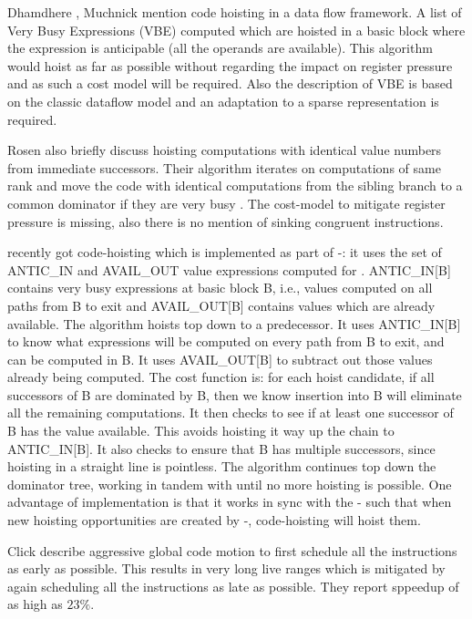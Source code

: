 \documentclass[acmlarge,review,anonymous]{acmart}\settopmatter{printfolios=true}
\begin{document}
Dhamdhere \cite{dhamdhere1988fast}, Muchnick \cite{steven1997advanced} mention
code hoisting in a data flow framework. A list of Very Busy Expressions (VBE)
computed which are hoisted in a basic block where the expression is
anticipable (all the operands are available). This algorithm would hoist as far
as possible without regarding the impact on register pressure and as such a cost
model will be required.  Also the description of VBE is based on the classic
dataflow model and an adaptation to a sparse \SSA{} representation is required.

Rosen \cite{rosen1988global} also briefly discuss hoisting computations with
identical value numbers from immediate successors. Their algorithm iterates on
computations of same rank and move the code with identical computations from the
sibling branch to a common dominator if they are very busy
\cite{steven1997advanced}. The cost-model to mitigate register pressure is
missing, also there is no mention of sinking congruent instructions.

\GCC{} recently got code-hoisting \cite{GCCCodeHoisting} which is implemented as
part of \GVN{}-\PRE{}: it uses the set of ANTIC\_IN and AVAIL\_OUT value
expressions computed for \PRE{}. ANTIC\_IN[B] contains very busy expressions at
basic block B, i.e., values computed on all paths from B to exit and
AVAIL\_OUT[B] contains values which are already available. The algorithm hoists
top down to a predecessor.  It uses ANTIC\_IN[B] to know what expressions will
be computed on every path from B to exit, and can be computed in B.  It uses
AVAIL\_OUT[B] to subtract out those values already being computed.  The cost
function is: for each hoist candidate, if all successors of B are dominated by
B, then we know insertion into B will eliminate all the remaining computations.
It then checks to see if at least one successor of B has the value available.
This avoids hoisting it way up the chain to ANTIC\_IN[B].  It also checks to
ensure that B has multiple successors, since hoisting in a straight line is
pointless.  The algorithm continues top down the dominator tree, working in
tandem with \PRE{} until no more hoisting is possible.  One advantage of \GCC{}
implementation is that it works in sync with the \GVN{}-\PRE{} such that when
new hoisting opportunities are created by \GVN{}-\PRE{}, code-hoisting will
hoist them.

Click \cite{click1995global} describe aggressive global code motion to first
schedule all the instructions as early as possible. This results in very long
live ranges which is mitigated by again scheduling all the instructions as late
as possible. They report sppeedup of as high as $23\%$.
\end{document}
